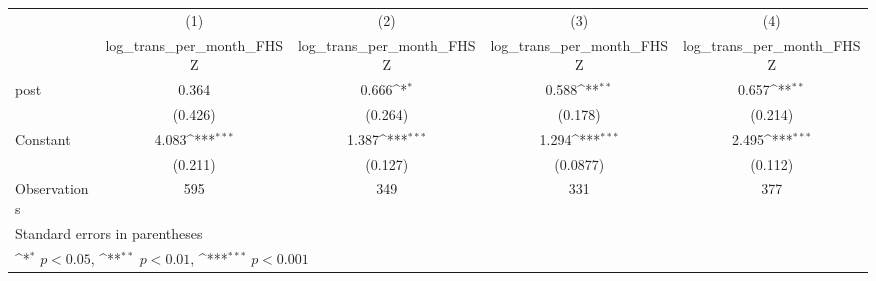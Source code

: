 {
\def\sym#1{\ifmmode^{#1}\else\(^{#1}\)\fi}
\begin{tabular}{l*{4}{c}}
\hline\hline
                    &\multicolumn{1}{c}{(1)}&\multicolumn{1}{c}{(2)}&\multicolumn{1}{c}{(3)}&\multicolumn{1}{c}{(4)}\\
                    &\multicolumn{1}{c}{log\_trans\_per\_month\_FHSZ}&\multicolumn{1}{c}{log\_trans\_per\_month\_FHSZ}&\multicolumn{1}{c}{log\_trans\_per\_month\_FHSZ}&\multicolumn{1}{c}{log\_trans\_per\_month\_FHSZ}\\
\hline
post                &       0.364         &       0.666\sym{*}  &       0.588\sym{**} &       0.657\sym{**} \\
                    &     (0.426)         &     (0.264)         &     (0.178)         &     (0.214)         \\
[1em]
Constant            &       4.083\sym{***}&       1.387\sym{***}&       1.294\sym{***}&       2.495\sym{***}\\
                    &     (0.211)         &     (0.127)         &    (0.0877)         &     (0.112)         \\
\hline
Observations        &         595         &         349         &         331         &         377         \\
\hline\hline
\multicolumn{5}{l}{\footnotesize Standard errors in parentheses}\\
\multicolumn{5}{l}{\footnotesize \sym{*} \(p<0.05\), \sym{**} \(p<0.01\), \sym{***} \(p<0.001\)}\\
\end{tabular}
}

